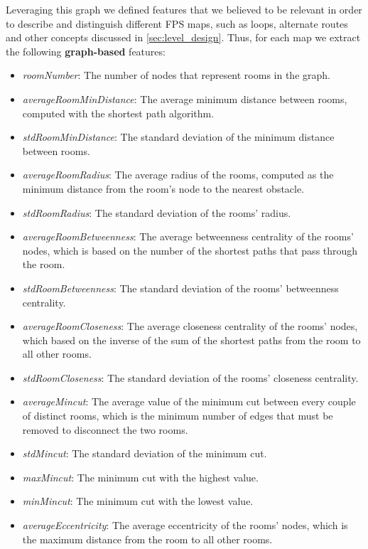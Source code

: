 \documentclass{Configuration_Files/PoliMi3i_thesis}
\begin{document}
Leveraging this graph we defined features that we believed to be relevant in order to describe and distinguish different FPS maps, such as loops, alternate routes and other concepts discussed in \ref{sec:level_design}.
Thus, for each map we extract the following \textbf{graph-based} features:

\begin{itemize}
    \item \textit{roomNumber}: The number of nodes that represent rooms in the graph.
    \item \textit{averageRoomMinDistance}: The average minimum distance between rooms, computed with the shortest path algorithm.
    \item \textit{stdRoomMinDistance}: The standard deviation of the minimum distance between rooms.
    \item \textit{averageRoomRadius}: The average radius of the rooms, computed as the minimum distance from the room's node to the nearest obstacle.
    \item \textit{stdRoomRadius}: The standard deviation of the rooms' radius.
    \item \textit{averageRoomBetweenness}: The average betweenness centrality of the rooms' nodes, which is based on the number of the shortest paths that pass through the room.
    \item \textit{stdRoomBetweenness}: The standard deviation of the rooms' betweenness centrality.
    \item \textit{averageRoomCloseness}: The average closeness centrality of the rooms' nodes, which based on the inverse of the sum of the shortest paths from the room to all other rooms.
    \item \textit{stdRoomCloseness}: The standard deviation of the rooms' closeness centrality.
    \item \textit{averageMincut}: The average value of the minimum cut between every couple of distinct rooms, which is the minimum number of edges that must be removed to disconnect the two rooms. 
    \item \textit{stdMincut}: The standard deviation of the minimum cut.
    \item \textit{maxMincut}: The minimum cut with the highest value.
    \item \textit{minMincut}: The minimum cut with the lowest value.
    \item \textit{averageEccentricity}: The average eccentricity of the rooms' nodes, which is the maximum distance from the room to all other rooms.

\end{itemize}
\end{document}
